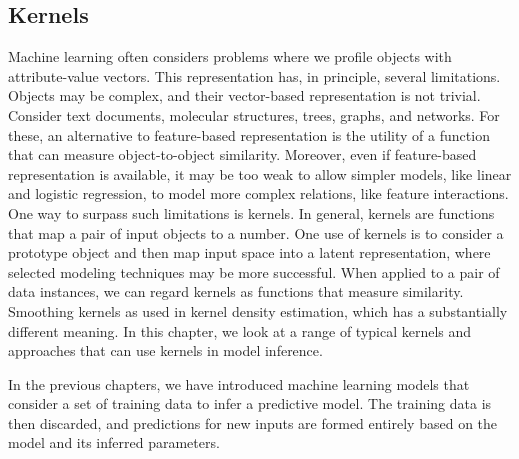 \begin{refsection}
\chapter{Kernels}

\begin{summary}
Machine learning often considers problems where we profile objects with attribute-value vectors. This representation has, in principle, several limitations. Objects may be complex, and their vector-based representation is not trivial. Consider text documents, molecular structures, trees, graphs, and networks. For these, an alternative to feature-based representation is the utility of a function that can measure object-to-object similarity. Moreover, even if feature-based representation is available, it may be too weak to allow simpler models, like linear and logistic regression, to model more complex relations, like feature interactions. One way to surpass such limitations is kernels. In general, kernels are functions that map a pair of input objects to a number. One use of kernels is to consider a prototype object and then map input space into a latent representation, where selected modeling techniques may be more successful. When applied to a pair of data instances, we can regard kernels as functions that measure similarity. Smoothing kernels as used in kernel density estimation, which has a substantially different meaning. In this chapter, we look at a range of typical kernels and approaches that can use kernels in model inference.
\end{summary}

In the previous chapters, we have introduced machine learning models that consider a set of training data to infer a predictive model. The training data is then discarded, and predictions for new inputs are formed entirely based on the model and its inferred parameters. 


\end{refsection}
